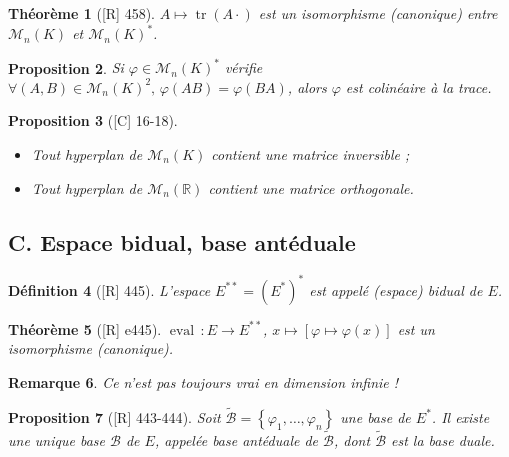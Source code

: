 \documentclass[10pt, a4paper, parskip=full, twoside, twocolumn]{report}
\newtheorem{definition}{Définition}
\newtheorem{theorem}[definition]{Théorème}
\newtheorem{proposition}[definition]{Proposition}
\newtheorem{remark}[definition]{Remarque}
\newcommand{\IR}{\mathbb{R}}
\newcommand{\M}{\mathcal{M}}
\newcommand{\B}{\mathcal{B}}
\DeclareMathOperator{\tr}{tr}
\DeclareMathOperator{\eval}{eval}
\begin{document}
\begin{tcolorbox}[
    breakable, %
    colback=developpement, %
    colframe=gray!0!black, %
    boxrule=0pt, %
    arc=1mm, %
	boxsep=0pt,
	left=0pt, right=0pt, top=0pt, bottom=0pt
]
\begin{theorem}[\textnormal{[R] 458}]
	\label{159dev11}
	$A\mapsto \tr(A\cdot)$ est un isomorphisme (canonique) entre $\M_n(K)$ et $\M_n(K)^*$.
\end{theorem}
\begin{proposition}
	\label{159dev12}
	Si $\varphi\in\M_n(K)^*$ vérifie $\forall(A,B)\in\M_n(K)^2,\,\varphi(AB)=\varphi(BA)$, alors $\varphi$ est colinéaire à la trace.
\end{proposition}
\begin{proposition}[\textnormal{[C] 16-18}]
	\label{159dev13}
	\begin{itemize}
		\item Tout hyperplan de $\M_n(K)$ contient une matrice inversible ;
		\item Tout hyperplan de $\M_n(\IR)$ contient une matrice orthogonale.
	\end{itemize}
\end{proposition}
\end{tcolorbox}

\subsection*{C. Espace bidual, base antéduale}

\begin{definition}[\textnormal{[R] 445}]
	L'espace $E^{**} = \left(E^*\right)^*$ est appelé \emph{(espace) bidual de $E$}.
\end{definition}
\begin{theorem}[\textnormal{[R] e445}]
	$\eval\,\colon E\to E^{**}$, $x\mapsto [\varphi\mapsto \varphi(x)]$ est un isomorphisme (canonique).
\end{theorem}

\begin{remark}
	Ce n'est pas toujours vrai en dimension infinie !
\end{remark}

\begin{proposition}[\textnormal{[R] 443-444}]
	Soit $\tilde{\B} = \left\{\varphi_1,\dots,\varphi_n\right\}$ une base de $E^*$.
	Il existe une unique base $\B$ de $E$, appelée \emph{base antéduale de $\tilde{\B}$}, dont $\tilde{\B}$ est la base duale.
\end{proposition}
\end{document}
